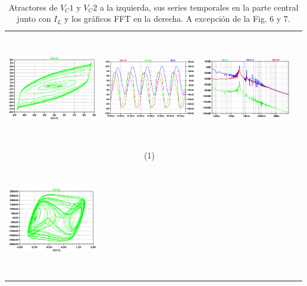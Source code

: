 \documentclass{rbf}
\begin{document}
\begin{table}[h]
    \centering
        \caption{\label{tab:Parámetro de control $r_0$ en el CCC} Atractores de $V_C1$ y $V_C2$ a la izquierda, sus series temporales en la parte central junto con $I_L$ y los gráficos FFT en la derecha. A excepción de la Fig. 6 y 7.}\\
        \begin{tabular}{c c c c}
        \hline
        \includegraphics[width=5cm,height=5cm]{r0/ro1.png}&
        \includegraphics[width=5cm,height=5cm]{r0/ro1TS.png}&
        \includegraphics[width=5cm,height=5cm]{r0/ro1FFT.png}&\\
        & (1) & \\
        \includegraphics[width=5cm,height=5cm]{r0/ro10.png}&

\end{tabular}
\end{table}
\end{document}
